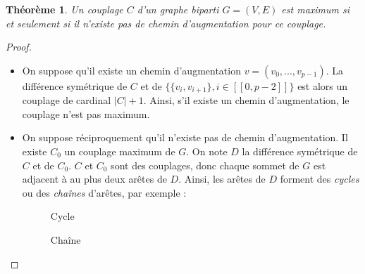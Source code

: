 \documentclass[11pt,a4paper]{article}
\newtheorem*{theorem}{Théorème} %
\begin{document}
\begin{theorem}
  Un couplage \(C\) d'un graphe biparti \(G=(V,E)\) est maximum si et seulement si il n'existe pas de chemin d'augmentation pour ce couplage.
\end{theorem}
\begin{proof}\leavevmode
  \begin{itemize}
    \item On suppose qu'il existe un chemin d'augmentation \(v = (v_0, ..., v_{p-1})\). La différence symétrique de \(C\) et de \(\{ \{v_i,v_{i+1}\}, i \in [\![0,p-2]\!] \}\) est alors un couplage de cardinal \(|C|+1\). Ainsi, s'il existe un chemin d'augmentation, le couplage n'est pas maximum.

    \item
      On suppose réciproquement qu'il n'existe pas de chemin d'augmentation. Il existe \(C_0\) un couplage maximum de \(G\). On note \(D\) la différence symétrique de \(C\) et de \(C_0\). \(C\) et \(C_0\) sont des couplages, donc chaque sommet de \(G\) est adjacent à au plus deux arêtes de \(D\). Ainsi, les arêtes de \(D\) forment des \textit{cycles} ou des \textit{chaînes} d'arêtes, par exemple :

      \begin{figure}[ht]
        \centering
        \begin{minipage}{.5\textwidth}
          \centering
          \caption{Cycle}
        \end{minipage}%
        \begin{minipage}{.5\textwidth}
          \centering
          \caption{Chaîne}
        \end{minipage}
      \end{figure}


\end{itemize}
\end{proof}
\end{document}
